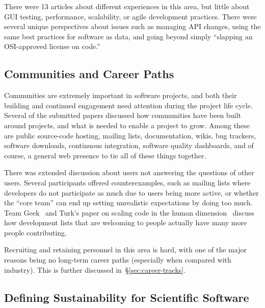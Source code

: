 \documentclass[11pt, oneside]{amsart}
\begin{document}
There were 13 articles about different experiences in this area, but little
about GUI testing, performance, scalability, or agile development practices.
There were several unique perspectives about issues such as managing API
changes, using the same best practices for software as data, and going beyond
simply ``slapping an OSI-approved license on code.''

\subsection{Communities and Career Paths}

Communities are extremely important in software projects, and both their
building and continued engagement need attention during the project life cycle.
Several of the submitted papers discussed how communities have been built around
projects, and what is needed to enable a project to grow. Among these are
public source-code hosting, mailing lists, documentation, wikis, bug trackers, software
downloads, continuous integration, software quality dashboards, and of course,
a general web presence to tie all of these things together.

There was extended discussion about users not answering the questions of other
users. Several participants
offered counterexamples, such as mailing lists where developers do not participate
as much due to users being more active, or whether the ``core
team'' can end up setting unrealistic expectations by doing too much. Team Geek~\cite{opac-b1134063}
and Turk's paper on scaling code in the human dimension~\cite{Turk:2013:SCH:2484762.2484782}  discuss how development
lists that are welcoming to people actually have many more people contributing.

Recruiting and retaining personnel in this area is hard,
with one of the major reasons being no long-term career paths (especially when
compared with industry). This is further discussed in~\S\ref{sec:career-tracks}.

%

\subsection{Defining Sustainability for Scientific Software}
\end{document}
